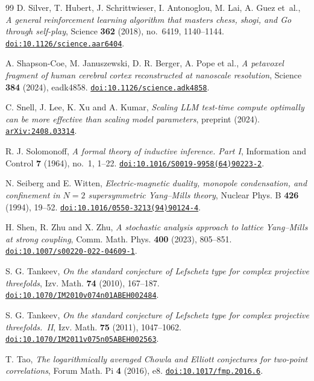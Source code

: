 \begin{thebibliography}{99}
D. Silver, T. Hubert, J. Schrittwieser, I. Antonoglou, M. Lai, A. Guez et~al.,
\emph{A general reinforcement learning algorithm that masters chess, shogi, and Go through self-play},
Science \textbf{362} (2018), no.~6419, 1140--1144.
\href{https://doi.org/10.1126/science.aar6404}{\nolinkurl{doi:10.1126/science.aar6404}}.

A. Shapson-Coe, M. Januszewski, D. R. Berger, A. Pope et al.,
\emph{A petavoxel fragment of human cerebral cortex reconstructed at nanoscale resolution},
Science \textbf{384} (2024), eadk4858.
\href{https://doi.org/10.1126/science.adk4858}{\nolinkurl{doi:10.1126/science.adk4858}}.

C. Snell, J. Lee, K. Xu and A. Kumar,
\emph{Scaling LLM test-time compute optimally can be more effective than scaling model parameters},
preprint (2024).
\href{https://arxiv.org/abs/2408.03314}{\nolinkurl{arXiv:2408.03314}}.

R. J. Solomonoff,
\emph{A formal theory of inductive inference. Part I},
Information and Control \textbf{7} (1964), no.~1, 1--22.
\href{https://doi.org/10.1016/S0019-9958(64)90223-2}{\nolinkurl{doi:10.1016/S0019-9958(64)90223-2}}.

N. Seiberg and E. Witten,
\emph{Electric-magnetic duality, monopole condensation, and confinement in $N=2$ supersymmetric Yang--Mills theory},
Nuclear Phys. B \textbf{426} (1994), 19--52.
\href{https://doi.org/10.1016/0550-3213(94)90124-4}{\nolinkurl{doi:10.1016/0550-3213(94)90124-4}}.

H. Shen, R. Zhu and X. Zhu,
\emph{A stochastic analysis approach to lattice Yang--Mills at strong coupling},
Comm. Math. Phys. \textbf{400} (2023), 805--851.
\href{https://doi.org/10.1007/s00220-022-04609-1}{\nolinkurl{doi:10.1007/s00220-022-04609-1}}.

S. G. Tankeev,
\emph{On the standard conjecture of Lefschetz type for complex projective threefolds},
Izv. Math. \textbf{74} (2010), 167--187.
\href{https://doi.org/10.1070/IM2010v074n01ABEH002484}{\nolinkurl{doi:10.1070/IM2010v074n01ABEH002484}}.

S. G. Tankeev,
\emph{On the standard conjecture of Lefschetz type for complex projective threefolds.~II},
Izv. Math. \textbf{75} (2011), 1047--1062.
\href{https://doi.org/10.1070/IM2011v075n05ABEH002563}{\nolinkurl{doi:10.1070/IM2011v075n05ABEH002563}}.

T. Tao,
\emph{The logarithmically averaged Chowla and Elliott conjectures for two-point correlations},
Forum Math. Pi \textbf{4} (2016), e8.
\href{https://doi.org/10.1017/fmp.2016.6}{\nolinkurl{doi:10.1017/fmp.2016.6}}.


\end{thebibliography}
